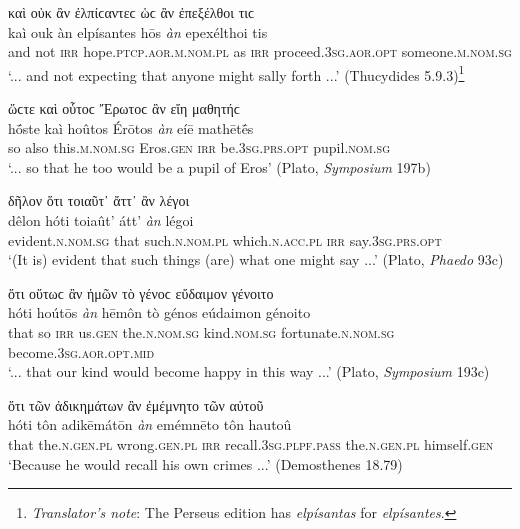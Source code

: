 \begin{exe}
\ex καὶ οὐκ ἂν ἐλπίϲαντεϲ ὡϲ ἂν ἐπεξέλθοι τιϲ\\
\gll kaì ouk àn elpísantes hōs \emph{àn} epexélthoi tis\\
and not \textsc{irr} hope.\textsc{ptcp.aor.m.nom.pl} as \textsc{irr} proceed.\textsc{3sg.aor.opt} someone.\textsc{m.nom.sg}\\
\trans `... and not expecting that anyone might sally forth ...' (Thucydides 5.9.3)\footnote{\emph{Translator's note}: The Perseus edition has \textit{elpísantas} for \textit{elpísantes}.}
\label{hosan2}
\end{exe}

\begin{exe}
\ex ὥϲτε καὶ οὗτοϲ Ἔρωτοϲ ἂν εἴη μαθητήϲ\\
\gll hṓste kaì hoûtos Érōtos \emph{àn} eíē mathētḗs\\
so also this.\textsc{m.nom.sg} Eros.\textsc{gen} \textsc{irr} be.\textsc{3sg.prs.opt} pupil.\textsc{nom.sg}\\
\trans `... so that he too would be a pupil of Eros' (Plato, \textit{Symposium} 197b)
\label{hoste}
\end{exe}

\begin{exe}
\ex δῆλον ὅτι τοιαῦτ᾽ ἄττ᾽ ἂν λέγοι\\
\gll dêlon hóti toiaût' átt' \emph{àn} légoi\\
evident.\textsc{n.nom.sg} that such.\textsc{n.nom.pl} which.\textsc{n.acc.pl} \textsc{irr} say.\textsc{3sg.prs.opt}\\
\trans `(It is) evident that such things (are) what one might say ...' (Plato, \textit{Phaedo} 93c)
\label{hoti1}
\end{exe}

\begin{exe}
\ex ὅτι οὕτωϲ ἂν ἡμῶν τὸ γένοϲ εὔδαιμον γένοιτο\\
\gll hóti hoútōs \emph{àn} hēmôn tò génos eúdaimon génoito\\
that so \textsc{irr} us.\textsc{gen} the.\textsc{n.nom.sg} kind.\textsc{nom.sg} fortunate.\textsc{n.nom.sg} become.\textsc{3sg.aor.opt.mid}\\
\trans `... that our kind would become happy in this way ...' (Plato, \textit{Symposium} 193c)
\label{hoti2}
\end{exe}

\begin{exe}
\ex ὅτι τῶν ἀδικημάτων ἂν ἐμέμνητο τῶν αὑτοῦ\\
\gll hóti tôn adikēmátōn \emph{àn} emémnēto tôn hautoû\\
that the.\textsc{n.gen.pl} wrong.\textsc{gen.pl} \textsc{irr} recall.\textsc{3sg.plpf.pass} the.\textsc{n.gen.pl} himself.\textsc{gen}\\
\trans `Because he would recall his own crimes ...' (Demosthenes 18.79)
\label{hoti3}
\end{exe}

